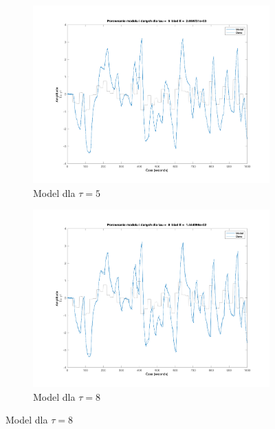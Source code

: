\documentclass[a4paper, 11pt]{article}
\begin{document}
\begin{enumerate}
\begin{figure}[h]
\begin{subfigure}[b]{0.475\textwidth}
			\centering
			\includegraphics[width=\linewidth]{./ModelsP1/modelTau5.png}
			\caption[Model dla \(\tau = 5\) ]
			{Model dla \(\tau = 5\)}
		\end{subfigure}
        \quad
        \begin{subfigure}[b]{0.475\textwidth}
			\centering
			\includegraphics[width=\linewidth]{./ModelsP1/modelTau8.png}
			\caption[Model dla \(\tau = 8\) ]
			{Model dla \(\tau = 8\)}
		\end{subfigure}

\end{figure}


\end{enumerate}
\end{document}
